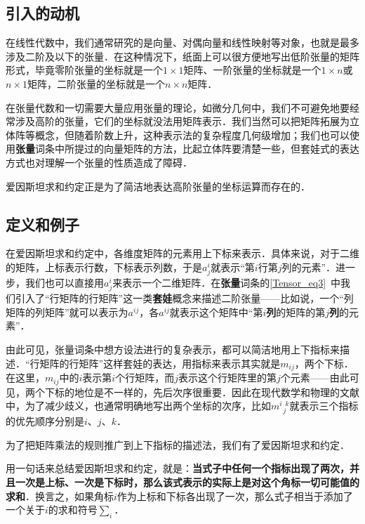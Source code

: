 
\subsection{引入的动机}

在线性代数中，我们通常研究的是向量、对偶向量和线性映射等对象，也就是最多涉及二阶及以下的张量．在这种情况下，纸面上可以很方便地写出低阶张量的矩阵形式，毕竟零阶张量的坐标就是一个$1\times 1$矩阵、一阶张量的坐标就是一个$1\times n$或$n\times 1$矩阵，二阶张量的坐标就是一个$n\times n$矩阵．

在张量代数和一切需要大量应用张量的理论，如微分几何中，我们不可避免地要经常涉及高阶的张量，它们的坐标就没法用矩阵表示．我们当然可以把矩阵拓展为立体阵等概念，但随着阶数上升，这种表示法的复杂程度几何级增加；我们也可以使用\textbf{张量}词条中所提过的向量矩阵的方法，比起立体阵要清楚一些，但套娃式的表达方式也对理解一个张量的性质造成了障碍．

爱因斯坦求和约定正是为了简洁地表达高阶张量的坐标运算而存在的．

\subsection{定义和例子}

在爱因斯坦求和约定中，各维度矩阵的元素用上下标来表示．具体来说，对于二维的矩阵，上标表示行数，下标表示列数，于是$a^i_j$就表示“第$i$行第$j$列的元素”．进一步，我们也可以直接用$a^i_j$来表示一个二维矩阵．在\textbf{张量}词条的\autoref{Tensor_eq3}~中我们引入了“行矩阵的行矩阵”这一类\textbf{套娃}概念来描述二阶张量——比如说，一个“列矩阵的列矩阵”就可以表示为$a^{ij}$，各$a^{ij}$就表示这个矩阵中“第$i$\textbf{列}的矩阵的第$j$\textbf{列}的元素”．

由此可见，张量词条中想方设法进行的复杂表示，都可以简洁地用上下指标来描述．“行矩阵的行矩阵”这样套娃的表达，用指标来表示其实就是$m_{ij}$，两个下标．在这里，$m_{ij}$中的$i$表示第$i$个行矩阵，而$j$表示这个行矩阵里的第$j$个元素——由此可见，两个下标的地位是不一样的，先后次序很重要．因此在现代数学和物理的文献中，为了减少歧义，也通常明确地写出两个坐标的次序，比如$m^{i\phantom{1}k}_{\phantom{1}j}$就表示三个指标的优先顺序分别是$i$、$j$、$k$．

为了把矩阵乘法的规则推广到上下指标的描述法，我们有了爱因斯坦求和约定．

用一句话来总结爱因斯坦求和约定，就是：\textbf{当式子中任何一个指标出现了两次，并且一次是上标、一次是下标时，那么该式表示的实际上是对这个角标一切可能值的求和}．换言之，如果角标$i$作为上标和下标各出现了一次，那么式子相当于添加了一个关于$i$的求和符号$\sum_i$．

